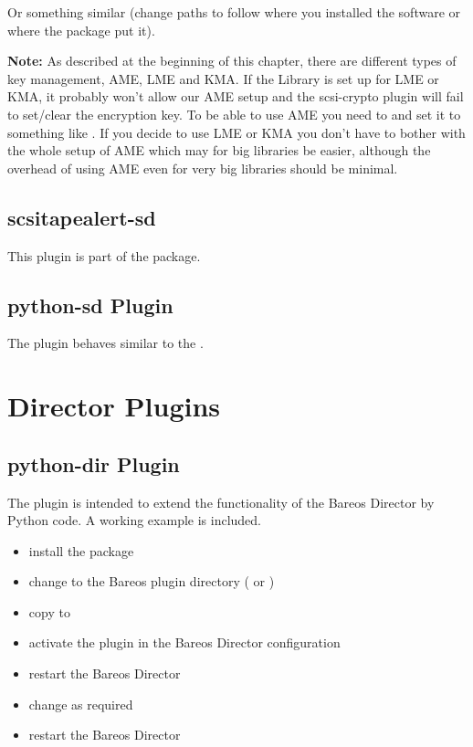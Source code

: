 Or something similar (change paths to follow where you installed the software or where the package put it).

\textbf{Note:} As described at the beginning of this chapter, there are different types of key management, AME, LME and KMA. If the Library is set up for LME or KMA, it probably won't allow our AME setup and the scsi-crypto plugin will fail to set/clear the encryption key. To be able to use AME you need to  and set it to something like .
If you decide to use LME or KMA you don't have to bother with the whole setup of AME which may for big libraries be easier, although the overhead of using AME even for very big libraries should be minimal.

\subsection{scsitapealert-sd}

This plugin is part of the  package.


\subsection{python-sd Plugin}

The  plugin behaves similar to the .


\section{Director Plugins}
\label{dirPlugins}

\subsection{python-dir Plugin}
\label{director-python-plugin}

The  plugin is intended to extend the functionality of the Bareos Director by Python code.
A working example is included.

\begin{itemize}
    \item install the  package
    \item change to the Bareos plugin directory ( or )
    \item copy  to 
    \item activate the plugin in the Bareos Director configuration
    \item restart the Bareos Director
    \item change  as required
    \item restart the Bareos Director
\end{itemize}


